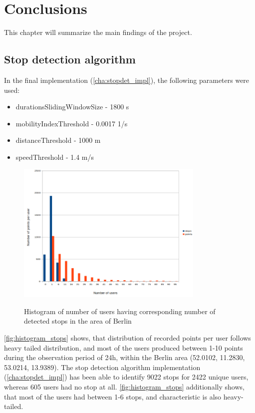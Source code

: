 \chapter{Conclusions}
\label{cha:conclusion}

This chapter will summarize the main findings of the project.

\section{Stop detection algorithm}

In the final implementation (\autoref{cha:stopdet_impl}), the following parameters were used:

\begin{itemize}  
\item durationsSlidingWindowSize - 1800 s
\item mobilityIndexThreshold - 0.0017 1/s
\item distanceThreshold - 1000 m
\item speedThreshold - 1.4 m/s
\end{itemize}

\begin{figure}[!ht]
	\centering
	\includegraphics[width=0.8\textwidth]{images/users_count.png}\\
	\caption{ Histogram of number of users having corresponding number of detected stops in the area of Berlin }
	\label{fig:histogram_stops}
\end{figure}

\FloatBarrier

\autoref{fig:histogram_stops} shows, that distribution of recorded points per user follows heavy tailed distribution, and most of the users produced between 1-10 points during the observation period of 24h, within the Berlin area (52.0102, 11.2830, 53.0214, 13.9389). The stop detection algorithm implementation (\autoref{cha:stopdet_impl}) has been able to identify 9022 stops for 2422 unique users, whereas 605 users had no stop at all. \autoref{fig:histogram_stops} additionally shows, that most of the users had between 1-6 stops, and characteristic is also heavy-tailed. 

